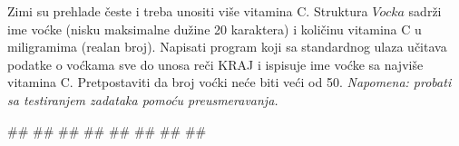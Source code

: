 \begin{Exercise}[label=p2.5_03] 
 Zimi su prehlade česte i treba unositi više vitamina C. Struktura $Vocka$ sadrži ime voćke (nisku maksimalne dužine 20 karaktera) i količinu vitamina C u miligramima (realan broj). Napisati program koji sa standardnog ulaza učitava podatke o voćkama sve do unosa reči KRAJ i ispisuje ime voćke sa najviše vitamina C. Pretpostaviti da broj voćki neće biti veći od 50. \textit{Napomena: probati sa testiranjem zadataka pomoću preusmeravanja.}\\
\begin{maxitest}
\begin{upotreba}{1}
#\naslovInt#
##
##
##
##
##
##
##
\end{upotreba}
\end{maxitest}

\end{Exercise}
\begin{Answer}[ref=p2.5_03]
\end{Answer}

